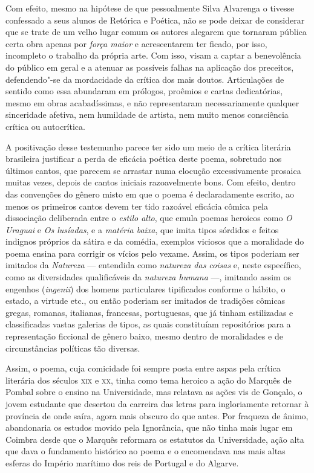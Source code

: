 Com efeito, mesmo na hipótese de que pessoalmente Silva Alvarenga o tivesse
confessado a seus alunos de Retórica e Poética, não se pode deixar de considerar
que se trate de um velho lugar comum os autores alegarem que tornaram pública
certa obra apenas por \textit{força maior} e acrescentarem ter ficado, por isso,
incompleto o trabalho da própria arte. Com isso, visam a captar a benevolência
do público em geral e a atenuar as possíveis falhas na aplicação dos preceitos,
defendendo"-se da mordacidade da crítica dos mais doutos.  Articulações de
sentido como essa abundaram em prólogos, proêmios e cartas dedicatórias, mesmo
em obras acabadíssimas, e não representaram necessariamente qualquer sinceridade
afetiva, nem humildade de artista, nem muito menos consciência crítica ou
autocrítica.

A positivação desse testemunho parece ter sido um meio de a crítica literária
brasileira justificar a perda de eficácia poética deste poema, sobretudo nos
últimos cantos, que parecem se arrastar numa elocução excessivamente prosaica
muitas vezes, depois de cantos iniciais razoavelmente bons.  Com efeito, dentro
das convenções do gênero misto em que o poema é declaradamente escrito, ao menos
os primeiros cantos devem ter tido razoável eficácia cômica pela dissociação
deliberada entre o \textit{estilo alto}, que emula poemas heroicos como
\textit{O Uraguai} e \textit{Os lusíadas}, e a \textit{matéria baixa}, que imita
tipos sórdidos e feitos indignos próprios da sátira e da comédia, exemplos
viciosos que a moralidade do poema ensina para corrigir os vícios pelo vexame.
Assim, os tipos poderiam ser imitados da \textit{Natureza} --- entendida como
\textit{natureza das coisas} e, neste específico, como as diversidades
qualificáveis da \textit{natureza humana} ---, imitando assim os engenhos
(\textit{ingenii}) dos homens particulares tipificados conforme o hábito, o
estado, a virtude etc., ou então poderiam ser imitados de tradições cômicas
gregas, romanas, italianas, francesas, portuguesas, que já tinham estilizadas e
classificadas vastas galerias de tipos, as quais constituíam repositórios para a
representação ficcional de gênero baixo, mesmo dentro de moralidades e de
circunstâncias políticas tão diversas.

Assim, o poema, cuja comicidade foi sempre posta entre aspas pela crítica
literária dos séculos \textsc{xix} e \textsc{xx}, tinha como tema heroico a ação do Marquês de
Pombal sobre o ensino na Universidade, mas relatava as ações vis de Gonçalo, o
jovem estudante que desertou da carreira das letras para ingloriamente retornar
à província de onde saíra, agora mais obscuro do que antes.  Por fraqueza de
ânimo, abandonaria os estudos movido pela Ignorância, que não tinha mais lugar
em Coimbra desde que o Marquês reformara os estatutos da Universidade, ação alta
que dava o fundamento histórico ao poema e o encomendava nas mais altas esferas
do Império marítimo dos reis de Portugal e do Algarve.

